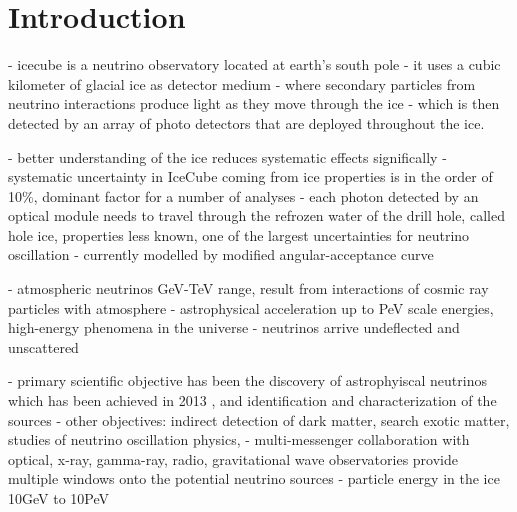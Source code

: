
\section{Introduction}
\label{sec:intro}

- icecube is a neutrino observatory located at earth's south pole
- it uses a cubic kilometer of glacial ice as detector medium \cite{evidence2013}
- where secondary particles from neutrino interactions produce light as they move through the ice
- which is then detected by an array of photo detectors that are deployed throughout the ice.

- better understanding of the ice reduces systematic effects significally \cite{icrc17pocam}
- systematic uncertainty in IceCube coming from ice properties is in the order of 10\%, dominant factor for a number of analyses \cite{icrc17pocam}
- each photon detected by an optical module needs to travel through the refrozen water of the drill hole, called hole ice, properties less known, one of the largest uncertainties for neutrino oscillation \cite{icrc17pocam}
- currently modelled by modified angular-acceptance curve \cite{icrc17pocam}

- atmospheric neutrinos GeV-TeV range, result from interactions of cosmic ray particles with atmosphere \cite{instrumentation}
- astrophysical acceleration up to PeV scale energies, high-energy phenomena in the universe \cite{instrumentation}
- neutrinos arrive undeflected and unscattered \cite{instrumentation}

- primary scientific objective has been the discovery of astrophyiscal neutrinos \cite{instrumentation} which has been achieved in 2013 \cite{instrumentation,evidence2013}, and identification and characterization of the sources \cite{instrumentation}
- other objectives: indirect detection of dark matter, search exotic matter, studies of neutrino oscillation physics, \cite{instrumentation}
- multi-messenger collaboration with optical, x-ray, gamma-ray, radio, gravitational wave observatories provide multiple windows onto the potential neutrino sources \cite{instrumentation}
- particle energy in the ice 10GeV to 10PeV \cite{instrumentation}




